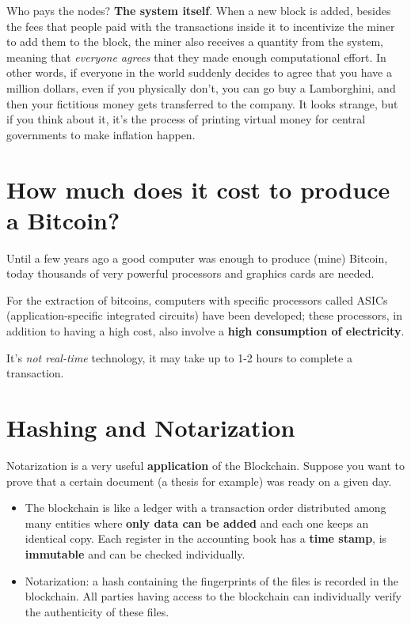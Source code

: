 Who pays the nodes? \textbf{The system itself}. When a new block is added, besides the fees that people paid with the transactions inside it to incentivize the miner to add them to the block, the miner also receives a quantity from the system, meaning that \textit{everyone agrees} that they made enough computational effort. In other words, if everyone in the world suddenly decides to agree that you have a million dollars, even if you physically don't, you can go buy a Lamborghini, and then your fictitious money gets transferred to the company. It looks strange, but if you think about it, it's the process of printing virtual money for central governments to make inflation happen.


\section{How much does it cost to produce a Bitcoin?}

Until a few years ago a good computer was enough to produce (mine) Bitcoin, today thousands of very powerful processors and graphics cards are needed.

For the extraction of bitcoins, computers with specific processors called ASICs (application-specific integrated circuits) have been developed; these processors, in addition to having a high cost, also involve a \textbf{high consumption of electricity}.

It's \textit{not real-time} technology, it may take up to 1-2 hours to complete a transaction.
\section{Hashing and Notarization}

Notarization is a very useful \textbf{application} of the Blockchain. Suppose you want to prove that a certain document (a thesis for example) was ready on a given day.
\begin{itemize}
	\item The blockchain is like a ledger with a transaction order distributed among many entities where \textbf{only data can be added} and each one keeps an identical copy. Each register in the accounting book has a \textbf{time stamp}, is \textbf{immutable} and can be checked individually.
	\item Notarization: a hash containing the fingerprints of the files is recorded in the blockchain. All parties having access to the blockchain can individually verify the authenticity of these files.
\end{itemize}

